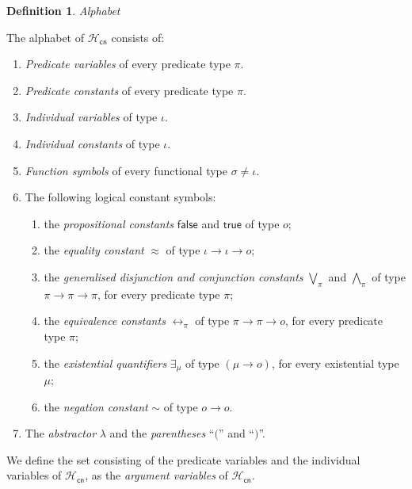 \documentclass[inscr,ack,preface]{dithesis}
\theoremstyle{definition}
\newtheorem{definition}{Definition}[]
\newcommand{\hcn}{$\mathcal{H}_\mathsf{cn}$}
\newcommand{\msf}[1]{$\mathsf{#1}$}
\begin{document}
\begin{definition}{\emph{Alphabet}}

The alphabet of \hcn{} consists of:
\begin{enumerate}
  \item \emph{Predicate variables} of every predicate type $\pi$.
  \item \emph{Predicate constants} of every predicate type $\pi$.
  \item \emph{Individual variables} of type $\iota$.
  \item \emph{Individual constants} of type $\iota$.
  \item \emph{Function symbols} of every functional type $\sigma \ne \iota$.
  \item The following logical constant symbols:
        \begin{enumerate}
          \item the \emph{propositional constants} \msf{false} and \msf{true}
                of type $o$;
          \item the \emph{equality constant} \msf{\approx}
                of type $\iota \rightarrow \iota \rightarrow o$;
          \item the \emph{generalised disjunction and conjunction constants} \msf{\bigvee_{\pi}} and \msf{\bigwedge_{\pi}}
                of type $\pi \rightarrow \pi \rightarrow \pi$,
                for every predicate type $\pi$;
          \item the \emph{equivalence constants} $\leftrightarrow_{\pi}$
                of type $\pi \rightarrow \pi \rightarrow o$,
                for every predicate type $\pi$;
          \item the \emph{existential quantifiers} $\exists_{\mu}$
                of type $\left( \mu \rightarrow o \right)$,
                for every existential type $\mu$;
          \item the \emph{negation constant} $\sim$ of type $o \rightarrow o$.
        \end{enumerate}
  \item The \emph{abstractor} $\lambda$ and the \emph{parentheses} ``\msf{(}'' and ``\msf{)}''.
\end{enumerate}

We define the set consisting of the predicate variables and the individual variables of \hcn{}, as the \emph{argument variables} of \hcn{}.
\end{definition}
\end{document}
